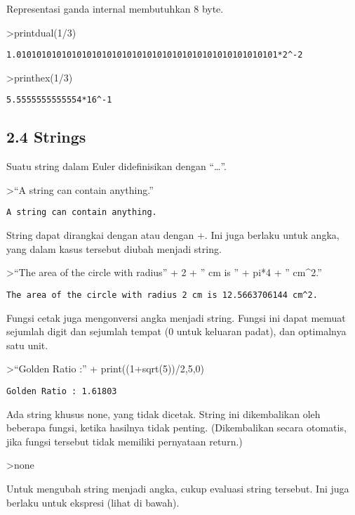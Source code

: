 \documentclass[
]{book}
\begin{document}
Representasi ganda internal membutuhkan 8 byte.

\textgreater printdual(1/3)

\begin{verbatim}
1.0101010101010101010101010101010101010101010101010101*2^-2
\end{verbatim}

\textgreater printhex(1/3)

\begin{verbatim}
5.5555555555554*16^-1
\end{verbatim}

\subsection{2.4 Strings}\label{strings}

Suatu string dalam Euler didefinisikan dengan ``\ldots{}''.

\textgreater{}``A string can contain anything.''

\begin{verbatim}
A string can contain anything.
\end{verbatim}

String dapat dirangkai dengan \textbar{} atau dengan +. Ini juga berlaku untuk angka, yang dalam kasus tersebut diubah menjadi string.

\textgreater{}``The area of the circle with radius'' + 2 + '' cm is '' + pi*4 + '' cm\^{}2.''

\begin{verbatim}
The area of the circle with radius 2 cm is 12.5663706144 cm^2.
\end{verbatim}

Fungsi cetak juga mengonversi angka menjadi string. Fungsi ini dapat memuat sejumlah digit dan sejumlah tempat (0 untuk keluaran padat), dan optimalnya satu unit.

\textgreater{}``Golden Ratio :'' + print((1+sqrt(5))/2,5,0)

\begin{verbatim}
Golden Ratio : 1.61803
\end{verbatim}

Ada string khusus none, yang tidak dicetak. String ini dikembalikan oleh beberapa fungsi, ketika hasilnya tidak penting. (Dikembalikan secara otomatis, jika fungsi tersebut tidak memiliki pernyataan return.)

\textgreater none

Untuk mengubah string menjadi angka, cukup evaluasi string tersebut. Ini juga berlaku untuk ekspresi (lihat di bawah).
\end{document}
